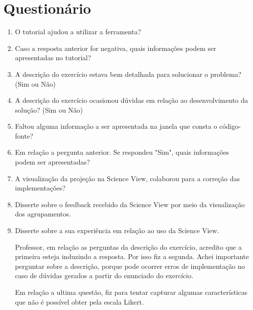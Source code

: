 \chapter{Questionário}
\label{apendice:questionario}


\begin{enumerate}
	\item O tutorial ajudou a utilizar a ferramenta?
	\item Caso a resposta anterior for negativa, quais informações podem ser apresentadas no tutorial?
	
	\item A descrição do exercício estava bem detalhada para solucionar o problema? (Sim ou Não)
	\item A descrição do exercício ocasionou dúvidas em relação ao desenvolvimento da solução? (Sim ou Não)
	\item Faltou alguma informação a ser apresentada na janela que consta o código-fonte?
	\item Em relação a pergunta anterior. Se respondeu "Sim", quais informações podem ser apresentadas?
	
	\item A visualização da projeção na Science View, colaborou para a correção das implementações?
	\item Disserte sobre o feedback recebido da Science View por meio da visualização dos agrupamentos.
	\item Disserte sobre a sua experiência em relação ao uso da Science View.
	
	Professor, em relação as perguntas da descrição do exercício, acredito que a primeira esteja induzindo a resposta. Por isso fiz a segunda. Achei importante perguntar sobre a descrição, porque pode ocorrer erros de implementação no caso de dúvidas gerados a partir do enunciado do exercício.
	
	Em relação a ultima questão, fiz para tentar capturar algumas características que não é possível obter pela escala Likert.
\end{enumerate}